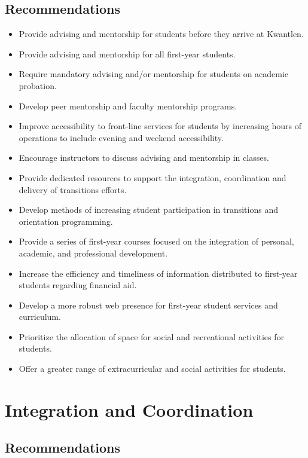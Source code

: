 \documentclass[10pt, letterpaper]{article}
\begin{document}
\subsection{Recommendations}

\begin{itemize}
\item
  Provide advising and mentorship for students before they arrive at
  Kwantlen.
\item
  Provide advising and mentorship for all first-year students.
\item
  Require mandatory advising and/or mentorship for students on academic
  probation.
\item
  Develop peer mentorship and faculty mentorship programs.
\item
  Improve accessibility to front-line services for students by
  increasing hours of operations to include evening and weekend
  accessibility.
\item
  Encourage instructors to discuss advising and mentorship in classes.
\item
  Provide dedicated resources to support the integration, coordination
  and delivery of transitions efforts.
\item
  Develop methods of increasing student participation in transitions and
  orientation programming.
\item
  Provide a series of first-year courses focused on the integration of
  personal, academic, and professional development.
\item
  Increase the efficiency and timeliness of information distributed to
  first-year students regarding financial aid.
\item
  Develop a more robust web presence for first-year student services and
  curriculum.
\item
  Prioritize the allocation of space for social and recreational
  activities for students.
\item
  Offer a greater range of extracurricular and social activities for
  students.
\end{itemize}

\section{Integration and Coordination}

\subsection{Recommendations}
\end{document}

